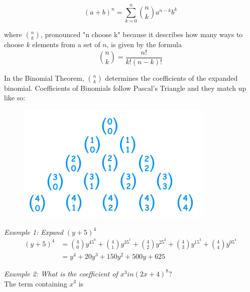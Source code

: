 \documentclass{article}
\begin{document}
    \begin{equation*}
        (a+b)^n
        = \sum^n_{k=0}\binom{n}{k}a^{n-k}b^k
    \end{equation*}

    \noindent where $\binom{n}{k}$, pronounced "n choose k" because it describes how many
    ways to choose $k$ elements from a set of $n$, is given by the formula \\

    \begin{equation*}
        \binom{n}{k}=\frac{n!}{k!(n-k)!}
    \end{equation*}

    \noindent In the Binomial Theorem, $\binom{n}{k}$ determines the coefficients of the
    expanded binomial. Coefficients of Binomials follow Pascal's Triangle and they match up
    like so: \\

    \begin{figure} [hbt!]
        \centering
        \includegraphics[scale = 0.5] {Resources/Unit11Sequences/pascal.PNG}
    \end{figure}

    \noindent \color{blue} \textit{Example 1: Expand $(y+5)^4$} \color{black} \\

    \begin{align*}
        (y+5)^4 &= \binom{4}{0}y^45^0
        + \binom{4}{1}y^35^1
        + \binom{4}{2}y^25^2
        + \binom{4}{3}y^15^3
        + \binom{4}{4}y^05^4 \\
        &= y^4+20y^3+150y^2+500y+625
    \end{align*}

    \noindent \color{blue} \textit{Example 2: What is the coefficient of $x^3 in (2x+4)^8?$}
    \color{black} \\
    The term containing $x^3$ is \\
\end{document}
